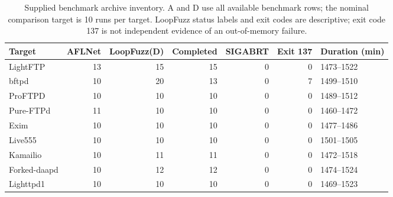 \begin{table}[!tbp]
\centering\small
\caption{Supplied benchmark archive inventory. A and D use all available benchmark rows; the nominal comparison target is 10 runs per target. LoopFuzz status labels and exit codes are descriptive; exit code 137 is not independent evidence of an out-of-memory failure.}
\label{tab:observed_inventory}
\begin{tabular}{lrrrrrl}
\toprule
Target & AFLNet & LoopFuzz(D) & Completed & SIGABRT & Exit 137 & Duration (min) \\
\midrule
LightFTP & 13 & 15 & 15 & 0 & 0 & 1473--1522 \\
bftpd & 10 & 20 & 13 & 0 & 7 & 1499--1510 \\
ProFTPD & 10 & 10 & 10 & 0 & 0 & 1489--1512 \\
Pure-FTPd & 11 & 10 & 10 & 0 & 0 & 1460--1472 \\
Exim & 10 & 10 & 10 & 0 & 0 & 1477--1486 \\
Live555 & 10 & 10 & 10 & 0 & 0 & 1501--1505 \\
Kamailio & 10 & 11 & 11 & 0 & 0 & 1472--1518 \\
Forked-daapd & 10 & 12 & 12 & 0 & 0 & 1474--1524 \\
Lighttpd1 & 10 & 10 & 10 & 0 & 0 & 1469--1523 \\
\bottomrule
\end{tabular}
\end{table}

